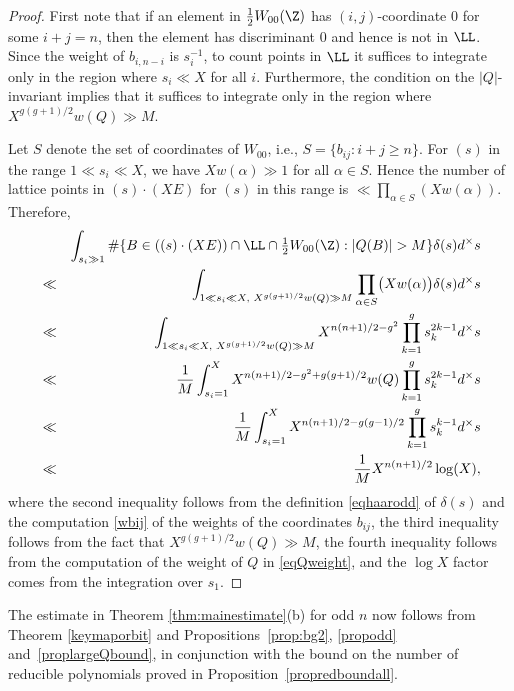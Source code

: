 \begin{proof}
First note that if an element in $\frac12 W_{00}(\Z)$ has
$(i,j)$-coordinate $0$ for some $i+j=n$, then the element has
discriminant $0$ and hence is not in $\LL$. Since the weight of $b_{i,n-i}$ is $s_i^{-1}$, to count points in $\LL$ it suffices to integrate only in the region where $s_i\ll X$ for all $i$.
Furthermore, the condition on the $|Q|$-invariant implies that
it suffices to integrate only in the region where $X^{g(g+1)/2}w(Q) \gg M$.



Let $S$ denote the set of coordinates of $W_{00}$, i.e.,
$S=\{b_{ij}:i+j\geq n\}$. For $(s)$ in the range $1\ll s_i\ll X$, we
have $Xw(\alpha)\gg 1$ for all $\alpha\in S$. Hence the number of lattice points in $(s)\cdot (XE)$ for $(s)$ in this range is $\ll \prod_{\alpha\in S}(Xw(\alpha))$. Therefore,
\begin{eqnarray*}
&&\int_{s_i\gg 1} \#\{B\in((s)\cdot (XE))\cap \LL\cap {\textstyle\frac12} W_{00}(\Z):|Q(B)|>M\}\delta(s)d^\times s \\
&\ll&\int_{1\ll s_i\ll X,\,\,X^{g(g+1)/2}w(Q) \gg M} \prod_{\alpha\in S}\bigl(Xw(\alpha)\bigr)\delta(s)d^\times s \\
&\ll&\int_{1\ll s_i\ll X,\,\,X^{g(g+1)/2}w(Q) \gg M} X^{n(n+1)/2-g^2}\prod_{k=1}^gs_k^{2k-1}d^\times s \\
&\ll&\frac{1}{M}\int_{s_i=1}^X X^{n(n+1)/2-g^2+g(g+1)/2}w(Q)\prod_{k=1}^gs_k^{2k-1}d^\times s \\
&\ll&\frac{1}{M}\int_{s_i=1}^X X^{n(n+1)/2-g(g-1)/2}\prod_{k=1}^gs_k^{k-1}d^\times s \\
&\ll&\frac{1}{M}X^{n(n+1)/2}\log(X),
\end{eqnarray*}
where the second inequality follows from the definition
\eqref{eqhaarodd} of $\delta(s)$ and the computation \eqref{wbij} of
the weights of the coordinates $b_{ij}$, the third inequality follows
from the fact that $X^{g(g+1)/2}w(Q) \gg M$, the fourth inequality
follows from the computation of the weight of $Q$ in
\eqref{eqQweight}, and the $\log X$ factor comes from the integration
over $s_1$.
\end{proof}


The estimate in Theorem \ref{thm:mainestimate}(b) for odd $n$ now
follows from Theorem \ref{keymaporbit} and
Propositions~\ref{prop:bg2}, \ref{propodd} and~\ref{proplargeQbound},
in conjunction with the bound on the number of reducible polynomials
proved in Proposition~\ref{propredboundall}.
